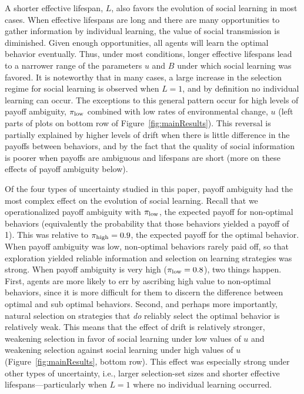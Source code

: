 \documentclass[letterpaper,11.5pt]{scrartcl}
\newcommand{\cm}[1]{{\textcolor{mypurple} {({\tiny CM:} #1)}}}
\begin{document}
A shorter effective lifespan, $L$, also favors the evolution of social learning in most cases. When effective lifespans are long and there are many opportunities to gather information by individual learning, the value of social transmission is diminished. Given enough opportunities, all agents will learn the optimal behavior eventually. Thus, under most conditions, longer effective lifespans lead to a narrower range of the parameters $u$ and $B$ under which social learning was favored. It is noteworthy that in many cases, a large increase in the selection regime for social learning is observed when $L=1$, and by definition no individual learning can occur. The exceptions to this general pattern occur for high levels of payoff ambiguity, $\pi_{\mathrm{low}}$ combined with low rates of environmental change, $u$ (left parts of plots on bottom row of Figure~\ref{fig:mainResults}). This reversal is partially explained by higher levels of drift when there is little difference in the payoffs between behaviors, and by the fact that the quality of social information is poorer when payoffs are ambiguous and lifespans are short (more on these effects of payoff ambiguity below).  

Of the four types of uncertainty studied in this paper, payoff ambiguity had the most
complex effect on the evolution of social learning. Recall that we operationalized
payoff ambiguity with $\pi_{\mathrm{low}}$, the expected payoff for non-optimal behaviors
(equivalently the probability that those behaviors yielded a payoff of 1). This was
relative to $\pi_{\mathrm{high}} = 0.9$, the expected payoff for the optimal behavior. When
payoff ambiguity was low, non-optimal behaviors rarely paid off, so that exploration
yielded reliable information and selection on learning strategies was strong. When
payoff ambiguity is very high ($\pi_{\mathrm{low}} = 0.8$), two things happen. First, agents are
more likely to err by ascribing high value to non-optimal behaviors, since it is
more difficult for them to discern the difference between optimal and sub optimal
behaviors. Second, and perhaps more importantly, natural selection on strategies
that \emph{do} reliably select the optimal behavior is relatively weak. This means that the effect of drift is relatively stronger, weakening selection in favor of social learning under low values of $u$ and weakening selection against social learning under high values of $u$ (Figure~\ref{fig:mainResults}, bottom row). 
This effect was especially strong under other types of uncertainty, i.e., larger selection-set sizes and shorter effective lifespans---particularly when $L=1$ where no individual learning occurred. 
\end{document}
